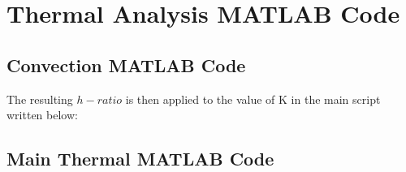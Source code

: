 \newpage
\section{Thermal Analysis MATLAB Code} \label{sec:appJ}
\subsection{Convection MATLAB Code}



The resulting $h-ratio$ is then applied to the value of K in the main script written below:

\subsection{Main Thermal MATLAB Code}




